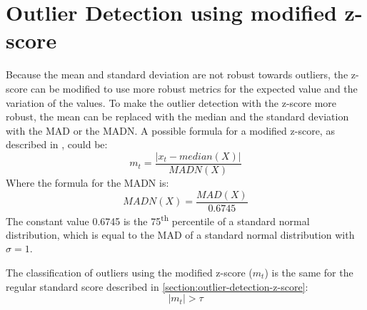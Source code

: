\section{Outlier Detection using modified z-score}\label{section:outlier-detection-modified-z-score}
Because the mean and standard deviation are not robust towards outliers, the z-score can be modified to use more robust metrics for the expected value and the variation of the values. To make the outlier detection with the z-score more robust, the mean can be replaced with the median and the standard deviation with the \ac{MAD} or the \ac{MADN}. A possible formula for a modified z-score, as described in \cite{baeOutlierDetectionSmoothing2019}, could be:
\begin{equation}
  m_t = \frac{|x_t - median(X)|}{MADN(X)}
\end{equation}
Where the formula for the \ac{MADN} is:
\begin{equation}
  MADN(X) = \frac{MAD(X)}{0.6745}
\end{equation}
The constant value 0.6745 is the 75\textsuperscript{th} percentile of a standard normal distribution, which is equal to the \ac{MAD} of a standard normal distribution with $\sigma = 1$.
\cite{baeOutlierDetectionSmoothing2019}
\par
The classification of outliers using the modified z-score ($m_t$) is the same for the regular standard score described in \autoref{section:outlier-detection-z-score}:
\begin{equation}
  |m_t| > \tau
\end{equation}


